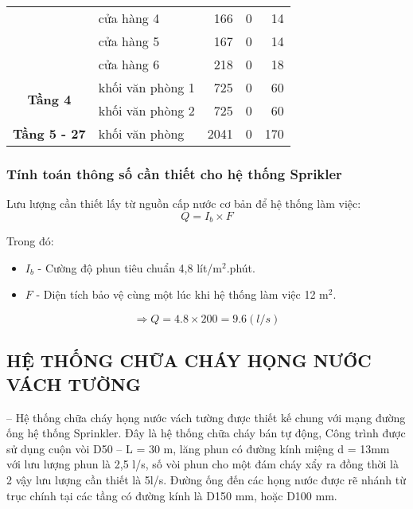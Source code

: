 \begin{table}[H]
\begin{tabular}{|c|l|r|r|r|}
		\cline{2-5}             & cửa hàng 4 & 166      & 0        & 14 \bigstrut\\
		\cline{2-5}             & cửa hàng 5 & 167      & 0        & 14 \bigstrut\\
		\cline{2-5}             & cửa hàng 6 & 218      & 0        & 18 \bigstrut\\
		\hline
		\multirow{2}[4]{*}{\textbf{Tầng 4}} & khối văn phòng 1 & 725      & 0        & 60 \bigstrut\\
		\cline{2-5}             & khối văn phòng 2 & 725      & 0        & 60 \bigstrut\\
		\hline
		\textbf{Tầng 5 - 27} & khối văn phòng & 2041     & 0        & 170 \bigstrut\\
		\hline
	\end{tabular}%
	\label{tab:addlabel}%
\end{table}%


\subsubsection{Tính toán thông số cần thiết cho hệ thống Sprikler}
Lưu lượng cần thiết lấy từ nguồn cấp nước cơ bản để hệ thống làm việc:
\begin{equation*}
	Q = I_{b} \times F
\end{equation*}

\break
Trong đó:
\begin{itemize}
	\item $I_{b}$ - Cường độ phun tiêu chuẩn 4,8 lít/m$^2$.phút.
	\item $F$ - Diện tích bảo vệ cùng một lúc khi hệ thống làm việc 12 m$^2$.
\end{itemize}
\begin{equation*}
	\Rightarrow Q = 4.8 \times 200 = 9.6 (l/s)
\end{equation*}

\subsection{HỆ THỐNG CHỮA CHÁY HỌNG NƯỚC VÁCH TƯỜNG}
-- Hệ thống chữa cháy họng nước vách tường được thiết kế chung với mạng đường ống hệ thống Sprinkler. Đây là hệ thống chữa cháy bán tự động, Công trình được sử dụng cuộn vòi D50 -- L = 30 m, lăng phun có đường kính miệng d = 13mm với lưu lượng phun
là 2,5 l/s, số vòi phun cho một đám cháy xẩy ra đồng thời là 2 vậy lưu lượng cần thiết là 5l/s. Đường ống đến các họng nước được rẽ nhánh từ trục chính tại các tầng có đường kính là D150 mm, hoặc D100 mm.


